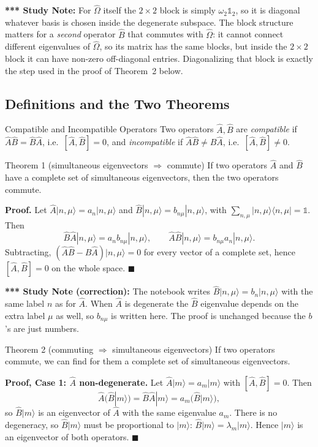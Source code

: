 \documentclass[11pt,a4paper]{article}
\begin{document}
\textbf{*** Study Note:} For $\hat\Omega$ itself the $2\times2$ block is simply $\omega_2\mathbb 1_2$, so it is diagonal whatever basis is chosen inside the degenerate subspace. The block structure matters for a \emph{second} operator $\hat B$ that commutes with $\hat\Omega$: it cannot connect different eigenvalues of $\hat\Omega$, so its matrix has the same blocks, but inside the $2\times2$ block it can have non-zero off-diagonal entries. Diagonalizing that block is exactly the step used in the proof of Theorem~2 below.

\subsection{Definitions and the Two Theorems}
\begin{thm}{Compatible and Incompatible Operators}
Two operators $\hat A,\hat B$ are \emph{compatible} if $\hat A\hat B=\hat B\hat A$, i.e.\ $[\hat A,\hat B]=0$, and \emph{incompatible} if $\hat A\hat B\neq\hat B\hat A$, i.e.\ $[\hat A,\hat B]\neq0$.
\end{thm}

\begin{thm}{Theorem 1 (simultaneous eigenvectors $\Rightarrow$ commute)}
If two operators $\hat A$ and $\hat B$ have a complete set of simultaneous eigenvectors, then the two operators commute.
\end{thm}
\textbf{Proof.} Let $\hat A|n,\mu\rangle=a_n|n,\mu\rangle$ and $\hat B|n,\mu\rangle=b_{n\mu}|n,\mu\rangle$, with $\sum_{n,\mu}|n,\mu\rangle\langle n,\mu|=\mathbb 1$. Then
\[
\hat B\hat A|n,\mu\rangle=a_nb_{n\mu}|n,\mu\rangle,\qquad \hat A\hat B|n,\mu\rangle=b_{n\mu}a_n|n,\mu\rangle .
\]
Subtracting, $(\hat A\hat B-\hat B\hat A)|n,\mu\rangle=0$ for every vector of a complete set, hence $[\hat A,\hat B]=0$ on the whole space. $\blacksquare$

\textbf{*** Study Note (correction):} The notebook writes $\hat B|n,\mu\rangle=b_n|n,\mu\rangle$ with the same label $n$ as for $\hat A$. When $\hat A$ is degenerate the $\hat B$ eigenvalue depends on the extra label $\mu$ as well, so $b_{n\mu}$ is written here. The proof is unchanged because the $b$'s are just numbers.

\begin{thm}{Theorem 2 (commuting $\Rightarrow$ simultaneous eigenvectors)}
If two operators commute, we can find for them a complete set of simultaneous eigenvectors.
\end{thm}
\textbf{Proof, Case 1: $\hat A$ non-degenerate.} Let $\hat A|m\rangle=a_m|m\rangle$ with $[\hat A,\hat B]=0$. Then
\[
\hat A\big(\hat B|m\rangle\big)=\hat B\hat A|m\rangle=a_m\big(\hat B|m\rangle\big),
\]
so $\hat B|m\rangle$ is an eigenvector of $\hat A$ with the same eigenvalue $a_m$. There is no degeneracy, so $\hat B|m\rangle$ must be proportional to $|m\rangle$: $\hat B|m\rangle=\lambda_m|m\rangle$. Hence $|m\rangle$ is an eigenvector of both operators. $\blacksquare$
\end{document}
